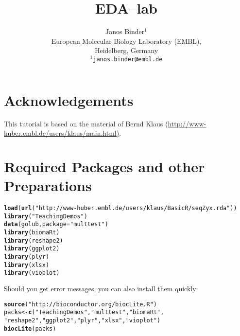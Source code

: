 \documentclass{article}\usepackage[]{graphicx}\usepackage[usenames,dvipsnames]{color}
\title{EDA--lab}
\author{Janos Binder$^1$ \\[1em]European Molecular Biology Laboratory (EMBL),\\ Heidelberg, Germany\\
\texttt{$^1$janos.binder@embl.de}}
\makeatletter
\newcommand{\hlstr}[1]{\textcolor[rgb]{0.192,0.494,0.8}{#1}}%
\newcommand{\hlstd}[1]{\textcolor[rgb]{0.345,0.345,0.345}{#1}}%
\newcommand{\hlkwb}[1]{\textcolor[rgb]{0.69,0.353,0.396}{#1}}%
\newcommand{\hlkwc}[1]{\textcolor[rgb]{0.333,0.667,0.333}{#1}}%
\newcommand{\hlkwd}[1]{\textcolor[rgb]{0.737,0.353,0.396}{\textbf{#1}}}%
\newenvironment{kframe}{%
 \def\at@end@of@kframe{}%
 \ifinner\ifhmode%
  \def\at@end@of@kframe{\end{minipage}}%
  \begin{minipage}{\columnwidth}%
 \fi\fi%
 \def\FrameCommand##1{\hskip\@totalleftmargin \hskip-\fboxsep
 \colorbox{shadecolor}{##1}\hskip-\fboxsep
     \hskip-\linewidth \hskip-\@totalleftmargin \hskip\columnwidth}%
 \MakeFramed {\advance\hsize-\width
   \@totalleftmargin\z@ \linewidth\hsize
   \@setminipage}}%
 {\par\unskip\endMakeFramed%
 \at@end@of@kframe}
\newenvironment{knitrout}{}{} %
\makeatother
\begin{document}
\maketitle


\tableofcontents

\section{Acknowledgements}

This tutorial is based on the material of Bernd Klaus (\href{http://www-huber.embl.de/users/klaus/main.html}{http://www-huber.embl.de/users/klaus/main.html)}.

\section{Required Packages and other Preparations} \label{sec:prep}

%
\begin{knitrout}
\color{fgcolor}\begin{kframe}
\begin{alltt}
\hlkwd{load}\hlstd{(}\hlkwd{url}\hlstd{(}\hlstr{"http://www-huber.embl.de/users/klaus/BasicR/seqZyx.rda"}\hlstd{))}
\hlkwd{library}\hlstd{(}\hlstr{"TeachingDemos"}\hlstd{)}
\hlkwd{data}\hlstd{(golub,} \hlkwc{package} \hlstd{=} \hlstr{"multtest"}\hlstd{)}
\hlkwd{library}\hlstd{(biomaRt)}
\hlkwd{library}\hlstd{(reshape2)}
\hlkwd{library}\hlstd{(ggplot2)}
\hlkwd{library}\hlstd{(plyr)}
\hlkwd{library}\hlstd{(xlsx)}
\hlkwd{library}\hlstd{(vioplot)}
\end{alltt}
\end{kframe}
\end{knitrout}
%

Should you get error messages, you can also install them quickly:

%
\begin{knitrout}
\color{fgcolor}\begin{kframe}
\begin{alltt}
\hlkwd{source}\hlstd{(}\hlstr{"http://bioconductor.org/biocLite.R"}\hlstd{)}
\hlstd{packs} \hlkwb{<-} \hlkwd{c}\hlstd{(}\hlstr{"TeachingDemos"}\hlstd{,} \hlstr{"multtest"}\hlstd{,} \hlstr{"biomaRt"}\hlstd{,}
           \hlstr{"reshape2"}\hlstd{,} \hlstr{"ggplot2"}\hlstd{,} \hlstr{"plyr"}\hlstd{,} \hlstr{"xlsx"}\hlstd{,} \hlstr{"vioplot"}\hlstd{)}
\hlkwd{biocLite}\hlstd{(packs)}
\end{alltt}
\end{kframe}
\end{knitrout}
%
\end{document}
